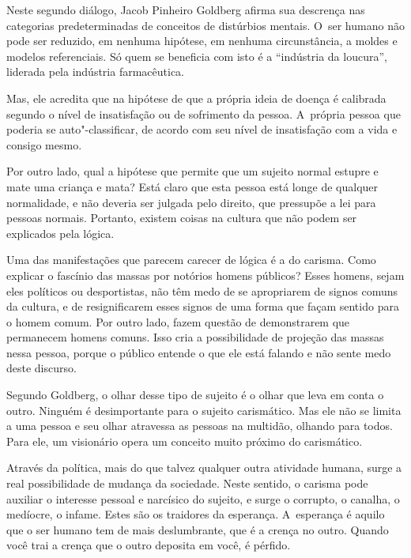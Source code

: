  


Neste segundo diálogo, Jacob Pinheiro Goldberg afirma sua descrença nas
categorias predeterminadas de conceitos de distúrbios mentais. O~ser
humano não pode ser reduzido, em nenhuma hipótese, em nenhuma
circunstância, a moldes e modelos referenciais. Só quem se beneficia com
isto é a ``indústria da loucura'', liderada pela indústria farmacêutica.

Mas, ele acredita que na hipótese de que a própria ideia de doença é
calibrada segundo o nível de insatisfação ou de sofrimento da pessoa. A~própria pessoa que poderia se auto"-classificar, de acordo com seu nível
de insatisfação com a vida e consigo mesmo.

Por outro lado, qual a hipótese que permite que um sujeito normal
estupre e mate uma criança e mata? Está claro que esta pessoa está longe
de qualquer normalidade, e não deveria ser julgada pelo direito, que
pressupõe a lei para pessoas normais. Portanto, existem coisas na
cultura que não podem ser explicados pela lógica.

Uma das manifestações que parecem carecer de lógica é a do carisma. Como
explicar o fascínio das massas por notórios homens públicos? Esses
homens, sejam eles políticos ou desportistas, não têm medo de se
apropriarem de signos comuns da cultura, e de resignificarem esses
signos de uma forma que façam sentido para o homem comum. Por outro
lado, fazem questão de demonstrarem que permanecem homens comuns. Isso
cria a possibilidade de projeção das massas nessa pessoa, porque o
público entende o que ele está falando e não sente medo deste discurso.

Segundo Goldberg, o olhar desse tipo de sujeito é o olhar que leva em
conta o outro. Ninguém é desimportante para o sujeito carismático. Mas ele não
se limita a uma pessoa e seu olhar atravessa as pessoas na multidão,
olhando para todos. Para ele, um visionário opera um conceito muito
próximo do carismático.

Através da política, mais do que talvez qualquer outra atividade humana,
surge a real possibilidade de mudança da sociedade. Neste sentido, o
carisma pode auxiliar o interesse pessoal e narcísico do sujeito, e
surge o corrupto, o canalha, o medíocre, o infame. Estes são os
traidores da esperança. A~esperança é aquilo que o ser humano tem de
mais deslumbrante, que é a crença no outro. Quando você trai a crença
que o outro deposita em você, é pérfido.

